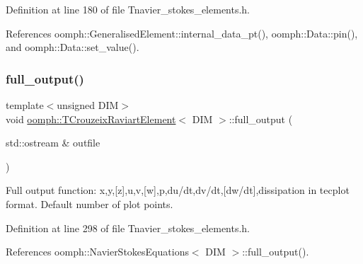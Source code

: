 Definition at line 180 of file Tnavier\+\_\+stokes\+\_\+elements.\+h.



References oomph\+::\+Generalised\+Element\+::internal\+\_\+data\+\_\+pt(), oomph\+::\+Data\+::pin(), and oomph\+::\+Data\+::set\+\_\+value().

\mbox{\label{classoomph_1_1TCrouzeixRaviartElement_afeab02f9b7a31b3befcdf67d40ac495e}} 
\subsubsection{\texorpdfstring{full\+\_\+output()}{full\_output()}\hspace{0.1cm}{\footnotesize\ttfamily [1/2]}}
{\footnotesize\ttfamily template$<$unsigned D\+IM$>$ \\
void \hyperlink{classoomph_1_1TCrouzeixRaviartElement}{oomph\+::\+T\+Crouzeix\+Raviart\+Element}$<$ D\+IM $>$\+::full\+\_\+output (\begin{DoxyParamCaption}\item[{std\+::ostream \&}]{outfile }\end{DoxyParamCaption})\hspace{0.3cm}{\ttfamily [inline]}}



Full output function\+: x,y,\mbox{[}z\mbox{]},u,v,\mbox{[}w\mbox{]},p,du/dt,dv/dt,\mbox{[}dw/dt\mbox{]},dissipation in tecplot format. Default number of plot points. 



Definition at line 298 of file Tnavier\+\_\+stokes\+\_\+elements.\+h.



References oomph\+::\+Navier\+Stokes\+Equations$<$ D\+I\+M $>$\+::full\+\_\+output().

\mbox{\label{classoomph_1_1TCrouzeixRaviartElement_a27a2342f56d71bfb17e11925b4674c90}} 
